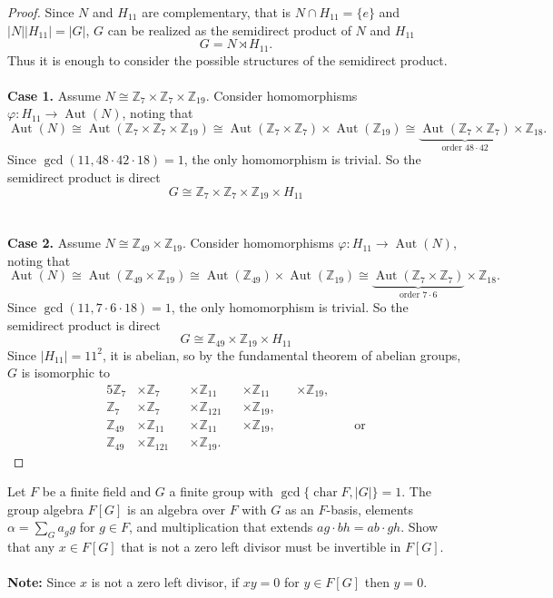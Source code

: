 \documentclass{article}
\newenvironment{problem}[2][Problem]{\begin{trivlist}
\item[\hskip \labelsep {\bfseries #1}\hskip \labelsep {\bfseries #2.}]}{\end{trivlist}}
\newcommand{\Z}{\mathbb Z}
\newcommand{\set}[1]{\{#1\}}
\newcommand{\Aut}{\operatorname{Aut}}
\newcommand{\fn}[3]{{#1 \colon #2 \rightarrow #3}}
\begin{document}
\begin{proof}
  Since $N$ and $H_{11}$ are complementary,
  that is $N \cap H_{11} = \set{e}$ and $|N||H_{11}| = |G|$,
  $G$ can be realized as the semidirect product of $N$ and $H_{11}$ \[
    G = N \rtimes H_{11}.
  \]
  Thus it is enough to consider the possible structures of the semidirect
  product.
  \\~\\
  \textbf{Case 1.} Assume $N \cong \Z_7 \times \Z_7 \times \Z_{19}$.
  Consider homomorphisms $\fn \varphi {H_{11}} {\Aut(N)}$, noting that \[
    \Aut(N)
    \cong \Aut(\Z_7 \times \Z_7 \times \Z_{19})
    \cong \Aut(\Z_7 \times \Z_7) \times \Aut(\Z_{19})
    \cong \underbrace{\Aut(\Z_7 \times \Z_7)}_{\text{order } 48 \cdot 42} \times \Z_{18}.
  \]
  Since $\gcd(11, 48\cdot42\cdot18) = 1$, the only homomorphism is trivial.
  So the semidirect product is direct \[
    G \cong \Z_{7} \times \Z_7 \times \Z_{19} \times H_{11}
  \]
  \\~\\
  \textbf{Case 2.} Assume $N \cong \Z_{49} \times \Z_{19}$.
  Consider homomorphisms $\fn \varphi {H_{11}} {\Aut(N)}$, noting that \[
    \Aut(N)
    \cong \Aut(\Z_{49} \times \Z_{19})
    \cong \Aut(\Z_{49}) \times \Aut(\Z_{19})
    \cong \underbrace{\Aut(\Z_7 \times \Z_7)}_{\text{order } 7 \cdot 6} \times \Z_{18}.
  \]
  Since $\gcd(11, 7\cdot6\cdot18) = 1$, the only homomorphism is trivial.
  So the semidirect product is direct \[
    G \cong \Z_{49} \times \Z_{19} \times H_{11}
  \]
  Since $|H_{11}| = 11^2$, it is abelian, so by the fundamental theorem
  of abelian groups, $G$ is isomorphic to \begin{alignat*}{5}
    \Z_{7} &\times \Z_{7} &&\times \Z_{11} &&\times \Z_{11} &&\times \Z_{19},&& \\
    \Z_{7} &\times \Z_{7} &&\times \Z_{121} &&\times \Z_{19}, && &&\\
    \Z_{49} &\times \Z_{11} &&\times \Z_{11} &&\times \Z_{19},&& && \text{ or}\\
    \Z_{49} &\times \Z_{121} &&\times \Z_{19}.  && && &&
  \end{alignat*}
\end{proof}
\pagebreak

\begin{problem}{3}
  Let $F$ be a finite field and $G$ a finite group with
  $\gcd\set{\operatorname{char} F, |G|} = 1.$ The group algebra $F[G]$ is an
  algebra over $F$ with $G$ as an $F$-basis, elements $\alpha = \sum_G a_gg$ for
  $g \in F$, and multiplication that extends $ag \cdot bh = ab \cdot gh$.
  Show that any $x \in F[G]$ that is not a zero left divisor must be invertible
  in $F[G]$.
  \\~\\
  \textbf{Note:} Since $x$ is not a zero left divisor, if $xy = 0$ for
  $y \in F[G]$ then $y=0$.
\end{problem}
\end{document}
